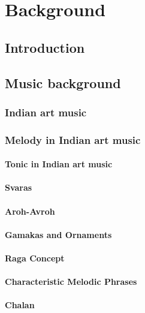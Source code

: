 
\chapter{Background}
\label{chap:background}

\section{Introduction}

\section{Music background}
\label{sec:music_background}

\subsection{Indian art music}
\subsection{Melody in Indian art music}

\subsubsection{Tonic in Indian art music}
\subsubsection{Svaras}
\subsubsection{Aroh-Avroh}
\subsubsection{Gamakas and Ornaments}
\subsubsection{Raga Concept}
\subsubsection{Characteristic Melodic Phrases}
\subsubsection{Chalan}

